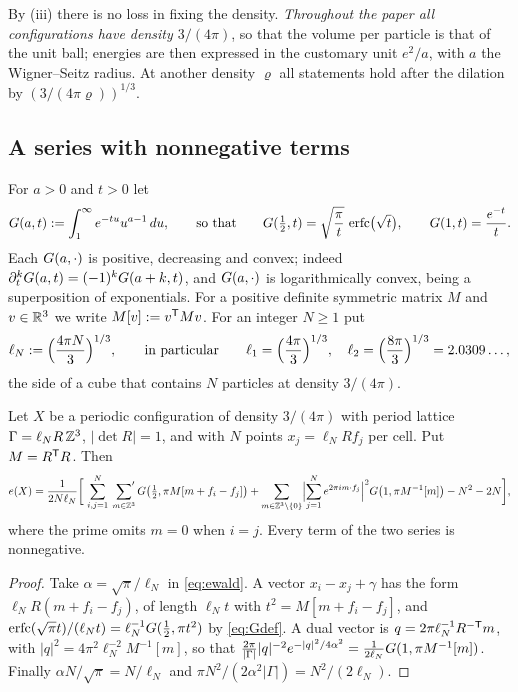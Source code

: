 By (iii) there is no loss in fixing the density. \emph{Throughout the paper all configurations have density $3/(4\pi)$}, so that the
volume per particle is that of the unit ball; energies are then expressed in the customary unit $e^2/a$, with $a$ the Wigner--Seitz
radius. At another density $\varrho$ all statements hold after the dilation by $(3/(4\pi\varrho))^{1/3}$.

\subsection{A series with nonnegative terms}\label{ssec:series}

For $a>0$ and $t>0$ let
\begin{equation}\label{eq:Gdef}
  G(a,t):=\int_1^\infty e^{-tu}u^{a-1}\,du ,\qquad\text{so that}\qquad
  G(\tfrac12,t)=\sqrt{\frac\pi t}\,\operatorname{erfc}\bigl(\sqrt t\bigr),\qquad G(1,t)=\frac{e^{-t}}t .
\end{equation}
Each $G(a,\cdot)$ is positive, decreasing and convex; indeed $\partial_t^kG(a,t)=(-1)^kG(a+k,t)$, and $G(a,\cdot)$ is
logarithmically convex, being a superposition of exponentials. For a positive definite symmetric matrix $M$ and $v\in\mathbb R^3$ we write
$M[v]:=v^\mathsf T Mv$. For an integer $N\ge1$ put
\[
  \ell_N:=\Bigl(\frac{4\pi N}3\Bigr)^{1/3},\qquad\text{in particular}\qquad \ell_1=\Bigl(\frac{4\pi}3\Bigr)^{1/3},\quad \ell_2=\Bigl(\frac{8\pi}3\Bigr)^{1/3}=2.0309\ldots,
\]
the side of a cube that contains $N$ particles at density $3/(4\pi)$.

\begin{proposition}\label{prop:series}
Let $X$ be a periodic configuration of density $3/(4\pi)$ with period lattice $\Gamma=\ell_NR\,\mathbb Z^3$, $|\det R|=1$, and with $N$ points
$x_j=\ell_NRf_j$ per cell. Put $M=R^\mathsf T R$. Then
\begin{equation}\label{eq:seriesN}
  e(X)=\frac1{2N\ell_N}\biggl[\ \sum_{i,j=1}^N\ \sideset{}{'}\sum_{m\in\Z^3}\Ga\bigl(\tfrac12,\pi M[m+f_i-f_j]\bigr)
    +\sum_{m\in\Z^3\setminus\{0\}}\Bigl|\sum_{j=1}^Ne^{2\pi im\cdot f_j}\Bigr|^2\Ga\bigl(1,\pi M^{-1}[m]\bigr)-N^2-2N\biggr],
\end{equation}
where the prime omits $m=0$ when $i=j$. Every term of the two series is nonnegative.
\end{proposition}

\begin{proof}
Take $\alpha=\sqrt\pi/\ell_N$ in \eqref{eq:ewald}. A vector $x_i-x_j+\gamma$ has the form $\ell_NR(m+f_i-f_j)$, of length
$\ell_N t$ with $t^2=M[m+f_i-f_j]$, and $\operatorname{erfc}(\sqrt\pi t)/(\ell_Nt)=\ell_N^{-1}G(\frac12,\pi t^2)$ by \eqref{eq:Gdef}. A dual vector is
$q=2\pi\ell_N^{-1}R^{-\mathsf T}m$, with $|q|^2=4\pi^2\ell_N^{-2}M^{-1}[m]$, so that
$\frac{2\pi}{|\Gamma|}|q|^{-2}e^{-|q|^2/4\alpha^2}=\frac1{2\ell_N}G(1,\pi M^{-1}[m])$. Finally $\alpha N/\sqrt\pi=N/\ell_N$ and
$\pi N^2/(2\alpha^2|\Gamma|)=N^2/(2\ell_N)$.
\end{proof}

